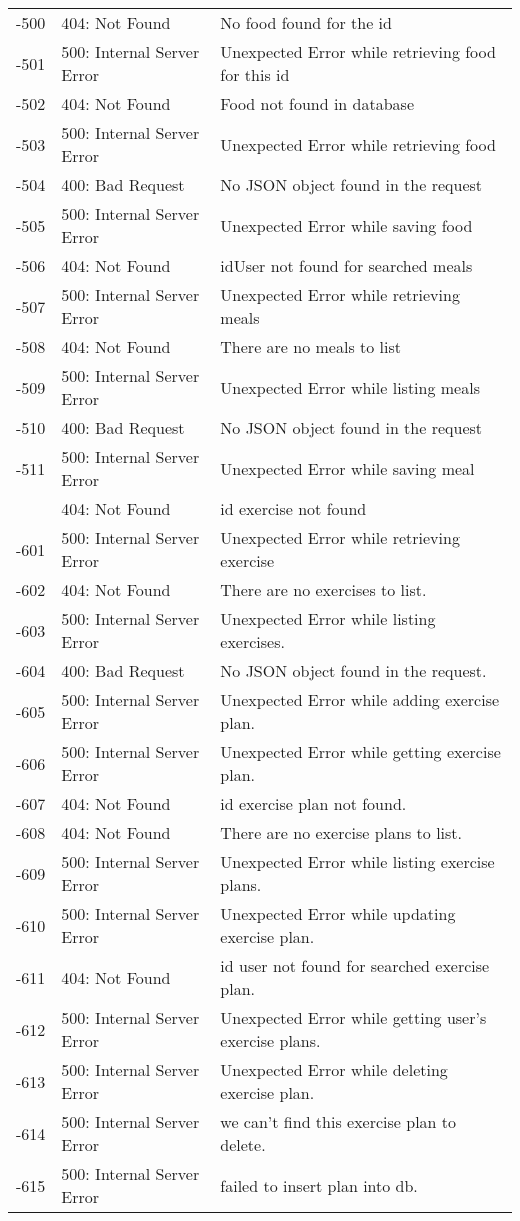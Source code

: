 \begin{longtable}{ | c | l | p{} | }
-500 & 404: Not Found & No food found for the id\\
-501 & 500: Internal Server Error & Unexpected Error while retrieving food for this id \\
-502 & 404: Not Found & Food not found in database\\
-503 & 500: Internal Server Error & Unexpected Error while retrieving food\\
-504 & 400: Bad Request & No JSON object found in the request \\
-505 & 500: Internal Server Error & Unexpected Error while saving food \\
-506 & 404: Not Found & idUser not found for searched meals\\
-507 & 500: Internal Server Error& Unexpected Error while retrieving meals\\
-508 & 404: Not Found & There are no meals to list\\
-509 & 500: Internal Server Error & Unexpected Error while listing meals\\
-510 & 400: Bad Request & No JSON object found in the request\\
-511 & 500: Internal Server Error & Unexpected Error while saving meal \\\hline
\newpage\hline
-600 & 404: Not Found & id exercise not found \\
-601 & 500: Internal Server Error & Unexpected Error while retrieving exercise\\
-602 & 404: Not Found & There are no exercises to list.\\
-603 & 500: Internal Server Error & Unexpected Error while listing exercises.\\
-604 & 400: Bad Request & No JSON object found in the request. \\
-605 & 500: Internal Server Error & Unexpected Error while adding exercise plan.\\
-606 &  500: Internal Server Error & Unexpected Error while getting exercise plan.\\
-607 & 404: Not Found & id exercise plan not found.\\
-608 & 404: Not Found & There are no exercise plans to list.\\
-609 & 500: Internal Server Error & Unexpected Error while listing exercise plans.\\
-610 & 500: Internal Server Error & Unexpected Error while updating exercise plan.\\
-611 & 404: Not Found & id user not found for searched exercise plan.\\
-612 & 500: Internal Server Error & Unexpected Error while getting user's exercise plans.\\
-613 & 500: Internal Server Error &  Unexpected Error while deleting exercise plan.\\
-614 & 500: Internal Server Error & we can't find this exercise plan to delete.\\
-615 & 500: Internal Server Error & failed to insert plan into db.
\\\hline


\end{longtable}
